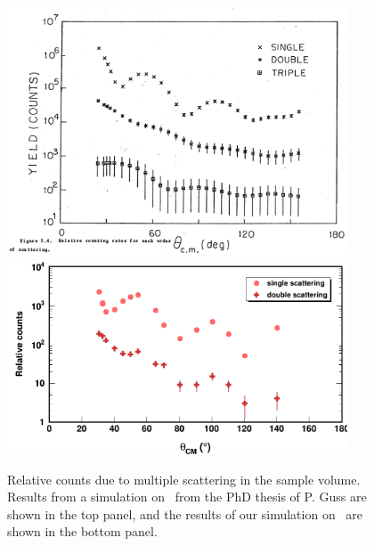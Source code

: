 \begin{figure}[ht!]
    \centering
    \includegraphics[width=0.9\textwidth]{figures/GussMultipleScattering.png}
    \label{GussMultipleScattering}
    \vspace*{\floatsep}
    \includegraphics[width=0.9\textwidth]{figures/multipleScattering.png}
    \caption[Relative counts due to multiple scattering in the sample volume]
    {
        Relative counts due to multiple scattering in the sample volume. Results from a simulation
        on \niEight\ from the PhD thesis of P. Guss \cite{GussPhDThesis} are shown in the top panel,
        and the results of our simulation on \snFour\ are shown in the bottom panel.
    }
    \label{multipleScattering}
\end{figure}

